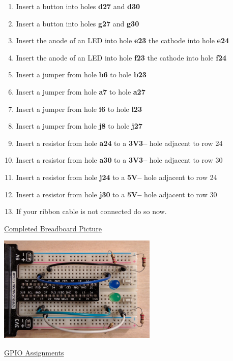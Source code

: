\begin{enumerate}
	\item Insert a button into holes \textbf{d27} and \textbf{d30}
	\item Insert a button into holes \textbf{g27} and \textbf{g30}
	
	\item Insert the anode of an LED into hole \textbf{e23} the cathode into hole \textbf{e24}
	\item Insert the anode of an LED into hole \textbf{f23} the cathode into hole \textbf{f24}
	
	\item Insert a jumper from hole \textbf{b6} to hole \textbf{b23}
	\item Insert a jumper from hole \textbf{a7} to hole \textbf{a27}
	\item Insert a jumper from hole \textbf{i6} to hole \textbf{i23}	
	\item Insert a jumper from hole \textbf{j8} to hole \textbf{j27}

	\item Insert a resistor from hole \textbf{a24} to a \textbf{3V3--} hole adjacent to row 24
	\item Insert a resistor from hole \textbf{a30} to a \textbf{3V3--} hole adjacent to row 30
	\item Insert a resistor from hole \textbf{j24} to a \textbf{5V--} hole adjacent to row 24
	\item Insert a resistor from hole \textbf{j30} to a \textbf{5V--} hole adjacent to row 30
	
	\item If your ribbon cable is not connected do so now.
\end{enumerate}

\underline{Completed Breadboard Picture}

\beforefig
\centerline{\includegraphics[height=2in]{pi_images/lab06images/PiLab06-GuessingGamePhoto.jpg}}
\afterfig

\underline{GPIO Assignments}

